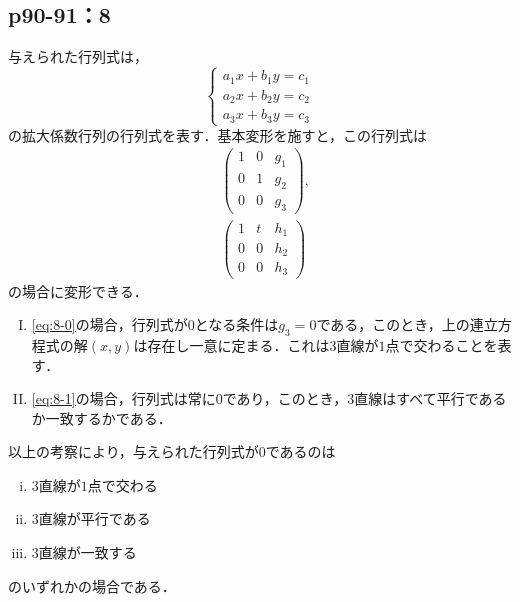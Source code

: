 \documentclass[uplatex,dvipdfmx,a4paper,10pt,fleqn]{jsarticle}
\begin{document}
\newpage 



\subsection*{p90-91：8}

\begin{tleftbar} 
    与えられた行列式は，
    \[
        \begin{cases}
            a_1 x + b_1 y =c_1 \\
            a_2 x + b_2 y =c_2 \\
            a_3 x + b_3 y =c_3 
        \end{cases}
    \]
    の拡大係数行列の行列式を表す．基本変形を施すと，この行列式は
    \begin{align} 
        & \begin{pmatrix}
            1 & 0 & g_1 \\
            0 & 1 & g_2 \\
            0 & 0 & g_3 
        \end{pmatrix}
        \label{eq:8-0}
        , \\
        &\begin{pmatrix} 
            1 & t & h_1 \\
            0 & 0 & h_2 \\
            0 & 0 & h_3 
        \end{pmatrix}
        \label{eq:8-1}
    \end{align}
    の場合に変形できる．

    \begin{enumerate}[(I)]
        \item \eqref{eq:8-0}の場合，行列式が$0$となる条件は$g_3 =0$である，このとき，上の連立方程式の解$(x,y)$は存在し一意に定まる．これは$3$直線が$1$点で交わることを表す．
        \item \eqref{eq:8-1}の場合，行列式は常に$0$であり，このとき，3直線はすべて平行であるか一致するかである．
    \end{enumerate}

    以上の考察により，与えられた行列式が$0$であるのは
    \begin{enumerate}[(i)]
    \item 3直線が$1$点で交わる
    \item 3直線が平行である
    \item 3直線が一致する
    \end{enumerate}
    のいずれかの場合である．
\end{tleftbar}
\end{document}
